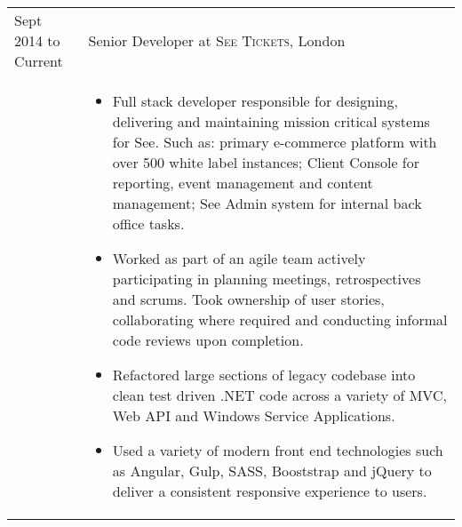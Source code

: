 \documentclass[a4paper,10pt]{article} %
\begin{document}
\begin{tabular}{ L{2cm} | L{11cm}}	



Sept 2014 to Current & Senior Developer at \textsc{See Tickets}, London \\

 
 

 
&\MPtrue	   
\begin{itemize}[leftmargin=*]
 
 
 
		\item Full stack developer responsible for designing, delivering and maintaining mission critical systems for See. Such as: primary e-commerce platform with over 500 white label instances; Client Console for reporting, event management and content management; See Admin system for internal back office tasks.

		\item Worked as part of an agile team actively participating in planning meetings, retrospectives and scrums. Took ownership of user stories, collaborating where required and conducting informal code reviews upon completion. 

		\item Refactored large sections of legacy codebase into clean test driven .NET code across a variety of MVC, Web API and Windows Service Applications. 

		\item Used a variety of modern front end technologies such as Angular, Gulp, SASS, Booststrap and jQuery to deliver a consistent responsive experience to users. 
		

\end{itemize}
\end{tabular}
\end{document}
